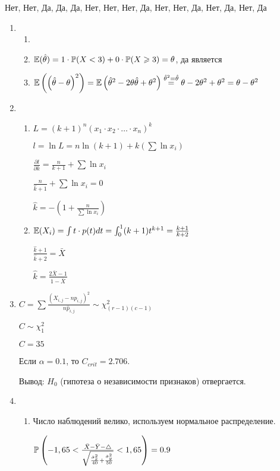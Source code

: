 \begin{enumerate}[resume]
Нет, Нет, Да, Да, Да, Нет, Нет, Нет, Да, Нет, Нет, Да, Нет, Да, Нет, Да



\begin{enumerate}

\item
\begin{enumerate}
\item
\item $\E(\hat{\theta})=1\cdot \P(X<3)+0\cdot \P(X \ge 3)=\theta$, да является
\item $\E\left(\left(\hat{\theta }-\theta \right)^{2} \right)=\E\left(\hat{\theta}^{2}-2\theta\hat{\theta}+\theta^{2}\right) \stackrel{\hat{\theta}^{2}=\hat{\theta}}{=} \theta-2\theta^{2}+\theta^{2}=\theta-\theta^{2}$
\end{enumerate}
\item
\begin{enumerate}
\item  $L=(k+1)^{n}(x_{1}\cdot x_{2} \cdot \ldots \cdot x_{n})^{k}$

$l=\ln{L}=n\ln(k+1)+k(\sum \ln{x_{i}})$

$\frac{\partial l}{\partial k}=\frac{n}{k+1}+\sum \ln{x_{i}}$

$\frac{n}{\hat{k}+1}+\sum \ln{x_{i}}=0$

$\hat{k}=-\left(1+\frac{n}{\sum \ln{x_{i}}} \right)$
\item  $\E(X_{i})=\int t\cdot p(t)dt=\int_{0}^{1} (k+1)t^{k+1}=\frac{k+1}{k+2}$

$\frac{\hat{k}+1}{\hat{k}+2}=\bar{X}$

$\hat{k}=\frac{2\bar{X}-1}{1-\bar{X}}$
\end{enumerate}
\item $C=\sum \frac{(X_{i,j}-n \hat{p}_{i,j})^{2}}{n\hat{p}_{i,j}}\sim \chi_{(r-1)(c-1)}^{2}$

$C\sim \chi_{1}^{2}$

$C=35$

Если $\alpha=0.1$, то $C_{crit}=2.706$.

Вывод: $H_{0}$ (гипотеза о независимости признаков) отвергается.
\item
\begin{enumerate}
\item Число наблюдений велико, используем нормальное распределение.

$\P\left(-1,65<\frac{\bar{X}-\bar{Y}-\triangle}{\sqrt{\frac{\hat{\sigma}_{x}^{2}}{40}+\frac{\hat{\sigma}_{y}^{2}}{50}}}<1,65\right)=0.9$


\end{enumerate}
\end{enumerate}
\end{enumerate}
